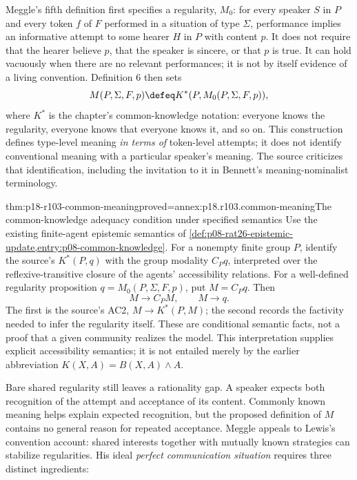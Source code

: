 Meggle's fifth definition first specifies a regularity, \(M_0\): for
every speaker \(S\) in \(P\) and every token \(f\) of \(F\)
performed in a situation of type \(\Sigma\), performance implies an
informative attempt to some hearer \(H\) in \(P\) with content
\(p\). It does not require that the hearer believe \(p\), that the
speaker is sincere, or that \(p\) is true. It can hold vacuously when
there are no relevant performances; it is not by itself evidence of a
living convention. Definition 6 then sets
\[
 M(P,\Sigma,F,p)\defeq K^*(P,M_0(P,\Sigma,F,p)),
\]
where \(K^*\) is the chapter's common-knowledge notation: everyone
knows the regularity, everyone knows that everyone knows it, and so on.
This construction defines type-level meaning \emph{in terms of} token-level
attempts; it does not identify conventional meaning with a particular
speaker's meaning. The source criticizes that identification, including
the invitation to it in Bennett's meaning-nominalist terminology.

\begin{hbtheorem}{thm:p18-r103-common-meaning}{proved=annex:p18.r103.common-meaning}{The common-knowledge adequacy condition under specified semantics}
Use the existing finite-agent epistemic semantics of
\cref{def:p08-rat26-epistemic-update,entry:p08-common-knowledge}.
For a nonempty finite group \(P\), identify the source's \(K^*(P,q)\)
with the group modality \(C_Pq\), interpreted over the
reflexive-transitive closure of the agents' accessibility relations.
For a well-defined regularity proposition \(q=M_0(P,\Sigma,F,p)\),
put \(M=C_Pq\). Then
\[
 M\to C_PM,\qquad M\to q.
\]
The first is the source's AC2, \(M\to K^*(P,M)\); the second records
the factivity needed to infer the regularity itself. These are conditional
semantic facts, not a proof that a given community realizes the model.
This interpretation supplies explicit accessibility semantics; it is not
entailed merely by the earlier abbreviation \(K(X,A)=B(X,A)\land A\).
\end{hbtheorem}

Bare shared regularity still leaves a rationality gap. A speaker expects
both recognition of the attempt and acceptance of its content. Commonly
known meaning helps explain expected recognition, but the proposed
definition of \(M\) contains no general reason for repeated acceptance.
Meggle appeals to Lewis's convention account: shared interests together
with mutually known strategies can stabilize regularities. His ideal
\emph{perfect communication situation} requires three distinct ingredients:

